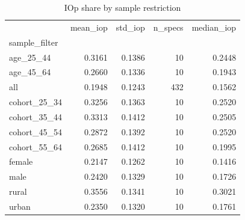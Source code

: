\begin{table}
\caption{IOp share by sample restriction}
\label{tab:by_sample}
\begin{tabular}{lrrrr}
\toprule
 & mean_iop & std_iop & n_specs & median_iop \\
sample_filter &  &  &  &  \\
\midrule
age_25_44 & 0.3161 & 0.1386 & 10 & 0.2448 \\
age_45_64 & 0.2660 & 0.1336 & 10 & 0.1943 \\
all & 0.1948 & 0.1243 & 432 & 0.1562 \\
cohort_25_34 & 0.3256 & 0.1363 & 10 & 0.2520 \\
cohort_35_44 & 0.3313 & 0.1412 & 10 & 0.2505 \\
cohort_45_54 & 0.2872 & 0.1392 & 10 & 0.2520 \\
cohort_55_64 & 0.2685 & 0.1412 & 10 & 0.1995 \\
female & 0.2147 & 0.1262 & 10 & 0.1416 \\
male & 0.2420 & 0.1329 & 10 & 0.1726 \\
rural & 0.3556 & 0.1341 & 10 & 0.3021 \\
urban & 0.2350 & 0.1320 & 10 & 0.1761 \\
\bottomrule
\end{tabular}
\end{table}
